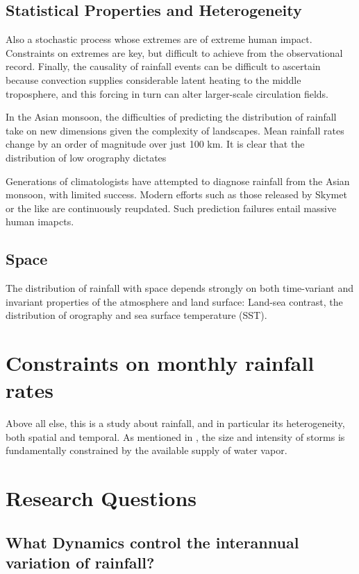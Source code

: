 \subsection{Statistical Properties and Heterogeneity}



Also a stochastic process whose extremes are of extreme human impact. Constraints on extremes are key, but difficult to achieve from the observational record. Finally, the causality of rainfall events can be difficult to ascertain because convection supplies considerable latent heating to the middle troposphere, and this forcing in turn can alter larger-scale circulation fields.

In the Asian monsoon, the difficulties of predicting the distribution of rainfall take on new dimensions given the complexity of landscapes. Mean rainfall rates change by an order of magnitude over just 100 km. It is clear that the distribution of low orography dictates 

Generations of climatologists have attempted to diagnose rainfall from the Asian monsoon, with limited success. Modern efforts such as those released by Skymet or the like are continuously reupdated. Such prediction failures entail massive human imapcts.


\subsection{Space}
The distribution of rainfall with space depends strongly on both time-variant and invariant properties of the atmosphere and land surface: Land-sea contrast, the distribution of orography and sea surface temperature (SST).

\section{Constraints on monthly rainfall rates}
Above all else, this is a study about rainfall, and in particular its heterogeneity, both spatial and temporal. As mentioned in \cite{Trenberth}, the size and intensity of storms is fundamentally constrained by the available supply of water vapor.

\section{Research Questions}

\subsection{What Dynamics control the interannual variation of rainfall?}
	
